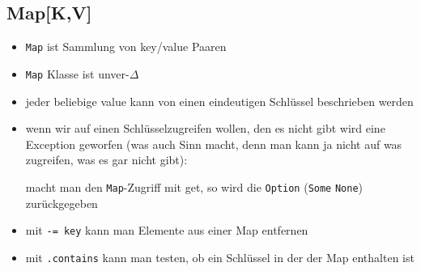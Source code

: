\subsection{Map[K,V]}
\begin{itemize}
  \item \texttt{Map} ist Sammlung von key/value Paaren
  \item \texttt{Map} Klasse ist unver-$\Delta$
  \item jeder beliebige value kann von einen eindeutigen Schlüssel
  beschrieben werden
    
  \item wenn wir auf einen Schlüsselzugreifen wollen, den es nicht
  gibt wird eine Exception geworfen (was auch Sinn macht, denn man
  kann ja nicht auf was zugreifen, was es gar nicht gibt):
 
  

  macht man den \texttt{Map}-Zugriff mit get, so wird die 
  \texttt{Option} (\texttt{Some} \oder \texttt{None}) zurückgegeben
  \item mit \texttt{-= key} kann man Elemente aus einer Map entfernen
  \item mit \texttt{.contains} kann man testen, ob ein Schlüssel in der
  der Map enthalten ist
\end{itemize}



